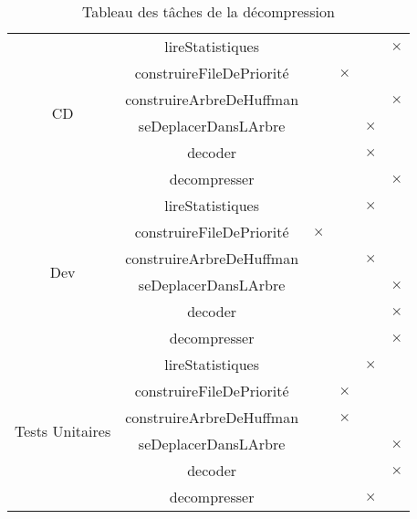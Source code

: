 \begin{table}[ht]
\begin{tabular}{|c|c|>{\centering\arraybackslash}p{1.5cm}|>{\centering\arraybackslash}p{1.5cm}|>{\centering\arraybackslash}p{1.5cm}|>{\centering\arraybackslash}p{1.5cm}|}
        \hline
        \multirow{6}{*}{CD}
        & lireStatistiques & & & & $\times$ \\
        \cline{2-6}
        & construireFileDePriorité & & $\times$ & & \\
        \cline{2-6}
        & construireArbreDeHuffman & & & & $\times$ \\
        \cline{2-6}
        & seDeplacerDansLArbre & & & $\times$ & \\
        \cline{2-6}
        & decoder & & & $\times$ & \\
        \cline{2-6}
        & decompresser & & & & $\times$ \\ 
        \hline
        \multirow{6}{*}{Dev}
        & lireStatistiques & & & $\times$ & \\
        \cline{2-6}
        & construireFileDePriorité & $\times$ & & & \\
        \cline{2-6}
        & construireArbreDeHuffman & & & $\times$ & \\
        \cline{2-6}
        & seDeplacerDansLArbre & & & & $\times$ \\
        \cline{2-6}
        & decoder & & & & $\times$ \\
        \cline{2-6}
        & decompresser & & & & $\times$ \\ 
        \hline
        \multirow{6}{*}{Tests Unitaires}
        & lireStatistiques & & & $\times$ & \\
        \cline{2-6}
        & construireFileDePriorité & & $\times$ & & \\
        \cline{2-6}
        & construireArbreDeHuffman & & $\times$ & & \\
        \cline{2-6}
        & seDeplacerDansLArbre & & & & $\times$ \\
        \cline{2-6}
        & decoder & & & & $\times$ \\
        \cline{2-6}
        & decompresser & & & $\times$ & \\ 
        \hline
    \end{tabular}
    \caption{Tableau des tâches de la décompression}
  \end{table}